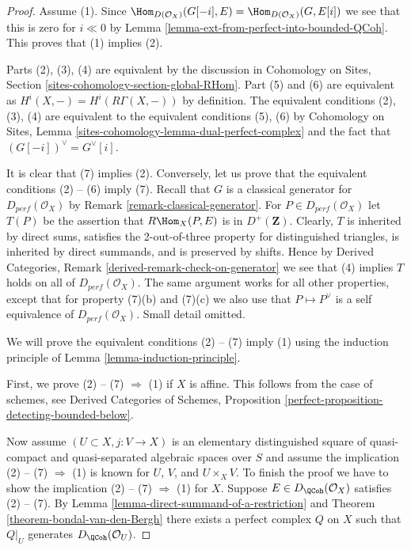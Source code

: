 \begin{proof}
Assume (1). Since
$\Hom_{D(\mathcal{O}_X)}(G[-i], E) = \Hom_{D(\mathcal{O}_X)}(G, E[i])$
we see that this is zero for $i \ll 0$ by
Lemma \ref{lemma-ext-from-perfect-into-bounded-QCoh}. This proves
that (1) implies (2).

\medskip\noindent
Parts (2), (3), (4) are equivalent by the discussion in
Cohomology on Sites, Section \ref{sites-cohomology-section-global-RHom}.
Part (5) and (6) are equivalent as $H^i(X, -) = H^i(R\Gamma(X, -))$
by definition. The equivalent conditions (2), (3), (4) are
equivalent to the equivalent conditions (5), (6) by
Cohomology on Sites, Lemma \ref{sites-cohomology-lemma-dual-perfect-complex}
and the fact that $(G[-i])^\vee = G^\vee[i]$.

\medskip\noindent
It is clear that (7) implies (2). Conversely,
let us prove that the equivalent conditions (2) -- (6) imply (7).
Recall that $G$ is a  classical generator for $D_{perf}(\mathcal{O}_X)$ by
Remark \ref{remark-classical-generator}.
For $P \in D_{perf}(\mathcal{O}_X)$ let $T(P)$ be the assertion that
$R\Hom_X(P, E)$ is in $D^+(\mathbf{Z})$.
Clearly, $T$ is inherited by direct sums,
satisfies the 2-out-of-three property for distinguished
triangles, is inherited by direct summands, and is preserved by shifts.
Hence by Derived Categories, Remark \ref{derived-remark-check-on-generator}
we see that (4) implies $T$ holds on all of $D_{perf}(\mathcal{O}_X)$.
The same argument works for all other properties, except that for property
(7)(b) and (7)(c) we also use that $P \mapsto P^\vee$ is a self
equivalence of $D_{perf}(\mathcal{O}_X)$. Small detail omitted.

\medskip\noindent
We will prove the equivalent conditions (2) -- (7) imply (1)
using the induction principle of
Lemma \ref{lemma-induction-principle}.

\medskip\noindent
First, we prove (2) -- (7) $\Rightarrow$ (1) if $X$ is affine.
This follows from the case of schemes, see
Derived Categories of Schemes, Proposition
\ref{perfect-proposition-detecting-bounded-below}.

\medskip\noindent
Now assume $(U \subset X, j : V \to X)$ is an elementary distinguished
square of quasi-compact and quasi-separated algebraic spaces over $S$
and assume the implication (2) -- (7) $\Rightarrow$ (1)
is known for $U$, $V$, and $U \times_X V$. To finish the proof
we have to show the implication (2) -- (7) $\Rightarrow$ (1) for $X$.
Suppose $E \in D_\QCoh(\mathcal{O}_X)$ satisfies (2) -- (7).
By Lemma \ref{lemma-direct-summand-of-a-restriction} and
Theorem \ref{theorem-bondal-van-den-Bergh} there exists a perfect
complex $Q$ on $X$ such that $Q|_U$ generates $D_\QCoh (\mathcal{O}_U)$.


\end{proof}

